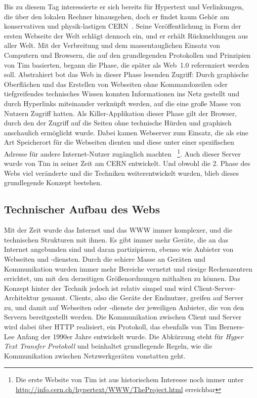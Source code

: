Bis zu diesem Tag interessierte er sich bereits für Hypertext und Verlinkungen, die über den lokalen Rechner hinausgehen, doch er findet kaum Gehör am konservativen und physik-lastigen CERN~\cite{Fiedler.2016}. 
Seine Veröffentlichung in Form der ersten Webseite der Welt schlägt dennoch ein, und er erhält Rückmeldungen aus aller Welt. 
Mit der Verbreitung und dem massentauglichen Einsatz von Computern und Browsern, die auf den grundlegenden Protokollen und Prinzipien von Tim basierten, begann die Phase, die später als Web~1.0 referenziert werden soll. 
Abstrahiert bot das Web in dieser Phase lesenden Zugriff: Durch graphische Oberflächen und das Erstellen von Webseiten ohne Kommandozeilen oder tiefgreifendes technisches Wissen konnten Informationen ins Netz gestellt und durch Hyperlinks miteinander verknüpft werden, auf die eine große Masse von Nutzern Zugriff hatten. 
Als Killer-Applikation dieser Phase gilt der Browser, durch den der Zugriff auf die Seiten ohne technische Hürden und graphisch anschaulich ermöglicht wurde. 
Dabei kamen Webserver zum Einsatz, die als eine Art Speicherort für die Webseiten dienten und diese unter einer spezifischen Adresse für andere Internet-Nutzer zugänglich machten~
\footnote{
	Die erste Website von Tim ist aus historischem Interesse noch immer unter \url{http://info.cern.ch/hypertext/WWW/TheProject.html} erreichbar
}. 
Auch dieser Server wurde von Tim in seiner Zeit am CERN entwickelt. Und obwohl die 2. Phase des Webs viel veränderte und die Techniken weiterentwickelt wurden, blieb dieses grundlegende Konzept bestehen.


\subsection{Technischer Aufbau des Webs}

Mit der Zeit wurde das Internet und das WWW immer komplexer, und die technischen Strukturen mit ihnen. 
Es gibt immer mehr Geräte, die an das Internet angebunden sind und daran partizipieren, ebenso wie Anbieter von Webseiten und -diensten. 
Durch die schiere Masse an Geräten und Kommunikation wurden immer mehr Bereiche vernetzt und riesige Rechenzentren errichtet, um mit den derzeitigen Größenordnungen mithalten zu können. 
Das Konzept hinter der Technik jedoch ist relativ simpel und wird Client-Server-Architektur genannt. 
Clients, also die Geräte der Endnutzer, greifen auf Server zu, und damit auf Webseiten oder -dienste der jeweiligen Anbieter, die von den Servern bereitgestellt werden.
Die Kommunikation zwischen Client und Server wird dabei über HTTP realisiert, ein Protokoll, das ebenfalls von Tim Berners-Lee Anfang der 1990er Jahre entwickelt wurde. 
Die Abkürzung steht für \textit{Hyper Text Transfer Protokoll} und beinhaltet grundlegende Regeln, wie die Kommunikation zwischen Netzwerkgeräten vonstatten geht.

